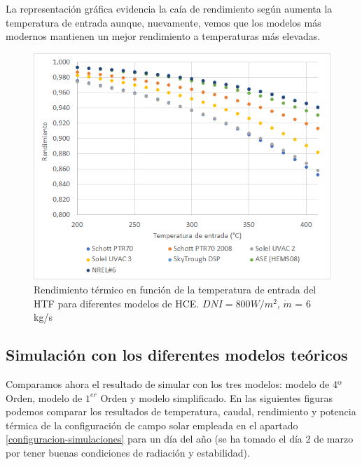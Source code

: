 La representación gráfica evidencia la caía de rendimiento según aumenta la temperatura de entrada aunque, nuevamente, vemos que los modelos más modernos mantienen un mejor rendimiento a temperaturas más elevadas.

\begin{figure}[h!]
\includegraphics[width=0.9\linewidth]{images/rendimiento_temperatura.png}
\caption{Rendimiento térmico en función de la temperatura de entrada del HTF para diferentes modelos de HCE. $DNI= 800 W/m^2$, $\dot m$ = 6 kg/s} 
\label{fig:test2a}
\end{figure}

\subsection{Simulación con los diferentes modelos teóricos}

Comparamos ahora el resultado de simular con los tres modelos: modelo de 4º Orden, modelo de $1^{er}$ Orden y modelo simplificado. En las siguientes figuras podemos comparar los resultados de temperatura, caudal, rendimiento y potencia térmica de la configuración de campo solar empleada en el apartado \ref{configuracion-simulaciones} para un día del año (se ha tomado el día 2 de marzo por tener buenas condiciones de radiación y estabilidad). 


